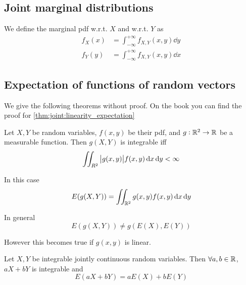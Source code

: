 \documentclass[12pt]{extarticle}
\begin{document}
\subsection{Joint marginal distributions}

\begin{definition}
    We define the marginal pdf w.r.t. $X$ and w.r.t. $Y$ as
    \begin{align}
        f_X(x) & = \int_{-\infty}^{+\infty} f_{X, Y}(x, y) \dd{y} \\
        f_Y(y) & = \int_{-\infty}^{+\infty} f_{X, Y}(x, y) \dd{x}
    \end{align}
\end{definition}

\subsection{Expectation of functions of random vectors}

We give the following theorems without proof.
On the book you can find the proof for \autoref{thm:joint:linearity_expectation}

\begin{theorem}
    Let $X, Y$ be random variables, $f(x,y)$ be their pdf, and $g: \mathbb{R}^2 \to \mathbb{R}$ be a measurable function.
    Then $g(X, Y)$ is integrable iff
    \begin{equation}
        \iint_{R^2} \abs{g(x, y)}f(x, y) \dd{x} \dd{y} < \infty
    \end{equation}

    In this case
    \begin{equation}
        E(g(X, Y)) = \iint_{\mathbb{R}^2} g(x, y)f(x, y) \dd{x} \dd{y}
    \end{equation}
\end{theorem}

\begin{remark}
    In general
    \begin{equation}
        E(g(X, Y)) \ne g(E(X), E(Y))
    \end{equation}

    However this becomes true if $g(x, y)$ is linear.
\end{remark}

\begin{theorem}
    \label{thm:joint:linearity_expectation}

    Let $X, Y$ be integrable jointly continuous random variables.
    Then $\forall a, b \in \mathbb{R}$, $aX + bY$ is integrable and
    \begin{equation}
        E(aX + bY) = aE(X) + bE(Y)
    \end{equation}
\end{theorem}
\end{document}
